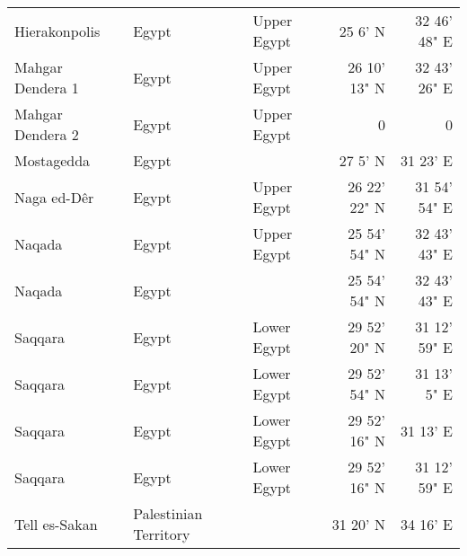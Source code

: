 \documentclass[a4paper,8pt]{article}
\begin{document}
\begin{landscape}
\begin{center}
\begin{longtable}{|>{\raggedright}p{20ex}|l|l|r|r|}
Hierakonpolis & Egypt & Upper Egypt & 25 6' N & 32 46' 48" E\\
Mahgar Dendera 1 & Egypt & Upper Egypt & 26 10' 13" N & 32 43' 26" E\\
Mahgar Dendera 2 & Egypt & Upper Egypt & 0 & 0\\
Mostagedda & Egypt &  & 27 5' N & 31 23' E\\
Naga ed-Dêr & Egypt & Upper Egypt & 26 22' 22" N & 31 54' 54" E\\
Naqada & Egypt & Upper Egypt & 25 54' 54" N & 32 43' 43" E\\
Naqada & Egypt &  & 25 54' 54" N & 32 43' 43" E\\
Saqqara & Egypt & Lower Egypt & 29 52' 20" N & 31 12' 59" E\\
Saqqara & Egypt & Lower Egypt & 29 52' 54" N & 31 13' 5" E\\
Saqqara & Egypt & Lower Egypt & 29 52' 16" N & 31 13' E\\
Saqqara & Egypt & Lower Egypt & 29 52' 16" N & 31 12' 59" E\\
Tell es-Sakan & Palestinian Territory &  & 31 20' N & 34 16' E\\
\end{longtable}
\end{center}
\end{landscape}
\end{document}
